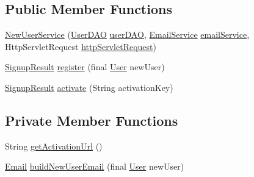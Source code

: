 \subsection*{Public Member Functions}
\begin{DoxyCompactItemize}
\item 
\hyperlink{classbr_1_1usp_1_1cata_1_1service_1_1_new_user_service_a4dd6a551afac57c1000bcfc5e885fcd5}{New\+User\+Service} (\hyperlink{classbr_1_1usp_1_1cata_1_1dao_1_1_user_d_a_o}{User\+D\+A\+O} \hyperlink{classbr_1_1usp_1_1cata_1_1service_1_1_new_user_service_a67d4700db9bda321b02d987085995a99}{user\+D\+A\+O}, \hyperlink{classbr_1_1usp_1_1cata_1_1service_1_1_email_service}{Email\+Service} \hyperlink{classbr_1_1usp_1_1cata_1_1service_1_1_new_user_service_afd564835d3b82f748745b6c899175c1f}{email\+Service}, Http\+Servlet\+Request \hyperlink{classbr_1_1usp_1_1cata_1_1service_1_1_new_user_service_a0f83da9b9dfcb3a750d110971e7d6086}{http\+Servlet\+Request})
\item 
\hyperlink{enumbr_1_1usp_1_1cata_1_1service_1_1_new_user_service_1_1_signup_result}{Signup\+Result} \hyperlink{classbr_1_1usp_1_1cata_1_1service_1_1_new_user_service_a931ce40045ffd8a9a0f1b3fc152d71fc}{register} (final \hyperlink{classbr_1_1usp_1_1cata_1_1model_1_1_user}{User} new\+User)
\item 
\hyperlink{enumbr_1_1usp_1_1cata_1_1service_1_1_new_user_service_1_1_signup_result}{Signup\+Result} \hyperlink{classbr_1_1usp_1_1cata_1_1service_1_1_new_user_service_a454660d66dbc9c8f05da70ea752b9147}{activate} (String activation\+Key)
\end{DoxyCompactItemize}
\subsection*{Private Member Functions}
\begin{DoxyCompactItemize}
\item 
String \hyperlink{classbr_1_1usp_1_1cata_1_1service_1_1_new_user_service_a07dc78b0903a3bf8e32f0f9decc33609}{get\+Activation\+Url} ()
\item 
\hyperlink{classbr_1_1usp_1_1cata_1_1model_1_1_email}{Email} \hyperlink{classbr_1_1usp_1_1cata_1_1service_1_1_new_user_service_a0cb78c605f1e2449c286e5709cb1629a}{build\+New\+User\+Email} (final \hyperlink{classbr_1_1usp_1_1cata_1_1model_1_1_user}{User} new\+User)
\end{DoxyCompactItemize}
